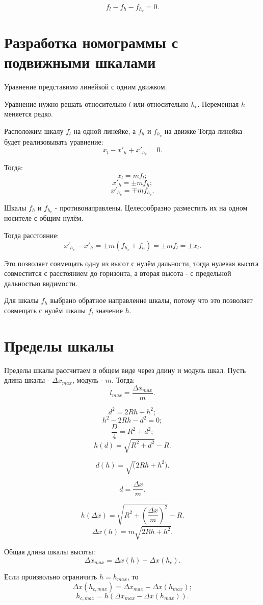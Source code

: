 $$f_l - f_h - f_{h_c} = 0.$$

\section{Разработка номограммы с подвижными шкалами}

Уравнение представимо линейкой с одним движком.

Уравнение нужно решать относительно $l$ или относительно $h_c$. Переменная $h$ меняется редко. 

Расположим шкалу $f_l$ на одной линейке, а $f_h$ и $f_{h_c}$ на движке
Тогда линейка будет реализовывать уравнение:
$$x_l - x'_h + x'_{h_c} = 0.$$

Тогда:
$$x_l = m f_l;$$
$$x'_h = \pm m f_h;$$
$$x'_{h_c} = \mp m f_{h_c}.$$

Шкалы $f_h$ и $f_{h_c}$ - противонаправлены. Целесообразно разместить их на одном носителе с общим нулём. 

Тогда расстояние: 
$$x'_{h_c} - x'_h = \pm m \left( f_{h_c} + f_h \right) = \pm m f_l = \pm x_l.$$

Это позволяет совмещать одну из высот с нулём дальности, тогда нулевая высота совместится с расстоянием до горизонта, а вторая высота - с предельной дальностью видимости. 

Для шкалы $f_h$ выбрано обратное направление шкалы, потому что это позволяет совмещать с нулём шкалы $f_l$ значение $h$.

\section{Пределы шкалы}

Пределы шкалы рассчитаем в общем виде через длину и модуль шкал. Пусть длина шкалы - $\Delta x_{max}$, модуль - $m$. Тогда:
$$l_{max} = \frac{\Delta x_{max}}{m}.$$

$$d^2 = 2Rh + h^2;$$
$$h^2 - 2Rh - d^2 = 0;$$
$$\frac{D}{4} = R^2 + d^2;$$
$$h(d) = \sqrt{R^2 + d^2} - R.$$

$$d(h) = \sqrt(2Rh + h^2).$$

$$d = \frac{\Delta x}{m}.$$

$$h(\Delta x) = \sqrt{R^2 + \left(\frac{\Delta x}{m}\right)^2} - R.$$
$$\Delta x(h) = m \sqrt{2Rh + h^2}.$$

Общая длина шкалы высоты:
$$\Delta x_{max} = \Delta x(h) + \Delta x(h_c).$$

Если произвольно ограничить $h = h_{max}$, то
$$\Delta x(h_{c,max}) = \Delta x_{max} - \Delta x(h_{max});$$
$$h_{c,max} = h\left(\Delta x_{max} - \Delta x(h_{max})\right).$$
